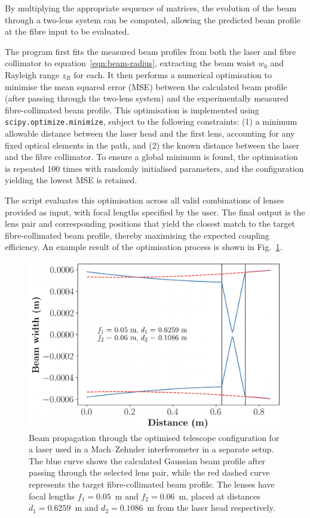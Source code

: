 By multiplying the appropriate sequence of matrices, the evolution of the beam through a two-lens system can be computed, allowing the predicted beam profile at the fibre input to be evaluated.

The program first fits the measured beam profiles from both the laser and fibre collimator to equation~\ref{eqn:beam-radius}, extracting the beam waist $w_0$ and Rayleigh range $z_R$ for each. It then performs a numerical optimisation to minimise the mean squared error (MSE) between the calculated beam profile (after passing through the two-lens system) and the experimentally measured fibre-collimated beam profile. This optimisation is implemented using \texttt{scipy.optimize.minimize}, subject to the following constraints: (1) a minimum allowable distance between the laser head and the first lens, accounting for any fixed optical elements in the path, and (2) the known distance between the laser and the fibre collimator. To ensure a global minimum is found, the optimisation is repeated 100 times with randomly initialised parameters, and the configuration yielding the lowest MSE is retained.

The script evaluates this optimisation across all valid combinations of lenses provided as input, with focal lengths specified by the user. The final output is the lens pair and corresponding positions that yield the closest match to the target fibre-collimated beam profile, thereby maximising the expected coupling efficiency. An example result of the optimisation process is shown in Fig.~\ref{fig:optimised-telescope}.

\begin{figure}[h]
    \centering
    \includegraphics[width=0.9\linewidth]{Figures/OptimalTelescope.png}
    \caption{Beam propagation through the optimised telescope configuration for a laser used in a Mach–Zehnder interferometer in a separate setup. The blue curve shows the calculated Gaussian beam profile after passing through the selected lens pair, while the red dashed curve represents the target fibre-collimated beam profile. The lenses have focal lengths $f_1 = 0.05$~m and $f_2 = 0.06$~m, placed at distances $d_1 = 0.6259$~m and $d_2 = 0.1086$~m from the laser head respectively.}
    \label{fig:optimised-telescope}
\end{figure}


